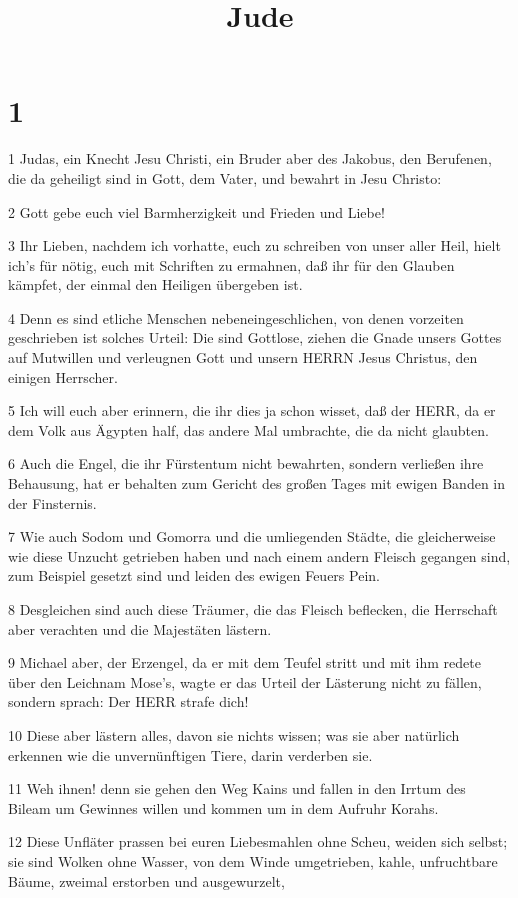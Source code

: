 

\title{Jude}


\chapter{1}

\par 1 Judas, ein Knecht Jesu Christi, ein Bruder aber des Jakobus, den Berufenen, die da geheiligt sind in Gott, dem Vater, und bewahrt in Jesu Christo:
\par 2 Gott gebe euch viel Barmherzigkeit und Frieden und Liebe!
\par 3 Ihr Lieben, nachdem ich vorhatte, euch zu schreiben von unser aller Heil, hielt ich's für nötig, euch mit Schriften zu ermahnen, daß ihr für den Glauben kämpfet, der einmal den Heiligen übergeben ist.
\par 4 Denn es sind etliche Menschen nebeneingeschlichen, von denen vorzeiten geschrieben ist solches Urteil: Die sind Gottlose, ziehen die Gnade unsers Gottes auf Mutwillen und verleugnen Gott und unsern HERRN Jesus Christus, den einigen Herrscher.
\par 5 Ich will euch aber erinnern, die ihr dies ja schon wisset, daß der HERR, da er dem Volk aus Ägypten half, das andere Mal umbrachte, die da nicht glaubten.
\par 6 Auch die Engel, die ihr Fürstentum nicht bewahrten, sondern verließen ihre Behausung, hat er behalten zum Gericht des großen Tages mit ewigen Banden in der Finsternis.
\par 7 Wie auch Sodom und Gomorra und die umliegenden Städte, die gleicherweise wie diese Unzucht getrieben haben und nach einem andern Fleisch gegangen sind, zum Beispiel gesetzt sind und leiden des ewigen Feuers Pein.
\par 8 Desgleichen sind auch diese Träumer, die das Fleisch beflecken, die Herrschaft aber verachten und die Majestäten lästern.
\par 9 Michael aber, der Erzengel, da er mit dem Teufel stritt und mit ihm redete über den Leichnam Mose's, wagte er das Urteil der Lästerung nicht zu fällen, sondern sprach: Der HERR strafe dich!
\par 10 Diese aber lästern alles, davon sie nichts wissen; was sie aber natürlich erkennen wie die unvernünftigen Tiere, darin verderben sie.
\par 11 Weh ihnen! denn sie gehen den Weg Kains und fallen in den Irrtum des Bileam um Gewinnes willen und kommen um in dem Aufruhr Korahs.
\par 12 Diese Unfläter prassen bei euren Liebesmahlen ohne Scheu, weiden sich selbst; sie sind Wolken ohne Wasser, von dem Winde umgetrieben, kahle, unfruchtbare Bäume, zweimal erstorben und ausgewurzelt,
